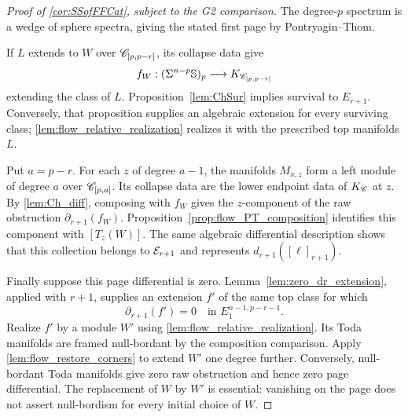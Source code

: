 \begin{proof}[Proof of \cref{cor:SSofFFCat}, subject to the G2 comparison]
    The degree-$p$ spectrum is a wedge of sphere spectra, giving the stated first page by Pontryagin--Thom.

    If $L$ extends to $W$ over $\mathscr{C}_{[p,p-r]}$, its collapse data give
    \[
        f_W:(\Sigma^{n-p}\mathbb{S})_p
        \longrightarrow K_{\mathscr{C}_{[p,p-r]}}
    \]
    extending the class of $L$. Proposition~\ref{lem:ChSur} implies survival to $E_{r+1}$. Conversely, that proposition supplies an algebraic extension for every surviving class; \cref{lem:flow_relative_realization} realizes it with the prescribed top manifolds $L$.

    Put $a=p-r$. For each $z$ of degree $a-1$, the manifolds $M_{x,z}$ form a left module of degree $a$ over $\mathscr{C}_{[p,a]}$. Its collapse data are the lower endpoint data of $K_{\mathscr{C}}$ at $z$. By \cref{lem:Ch_diff}, composing with $f_W$ gives the $z$-component of the raw obstruction $\partial_{r+1}(f_W)$. Proposition~\ref{prop:flow_PT_composition} identifies this component with $[T_z(W)]$. The same algebraic differential description shows that this collection belongs to $\mathcal{E}_{r+1}$ and represents $d_{r+1}([\ell]_{r+1})$.

    Finally suppose this page differential is zero. Lemma~\ref{lem:zero_dr_extension}, applied with $r+1$, supplies an extension $f'$ of the same top class for which
    \[
        \partial_{r+1}(f')=0
        \quad\text{in }E_1^{n-1,p-r-1}.
    \]
    Realize $f'$ by a module $W'$ using \cref{lem:flow_relative_realization}. Its Toda manifolds are framed null-bordant by the composition comparison. Apply \cref{lem:flow_restore_corners} to extend $W'$ one degree further. Conversely, null-bordant Toda manifolds give zero raw obstruction and hence zero page differential. The replacement of $W$ by $W'$ is essential: vanishing on the page does not assert null-bordism for every initial choice of $W$.
\end{proof}

